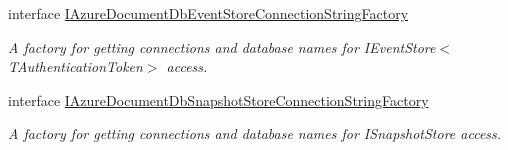 \begin{DoxyCompactItemize}
interface \hyperlink{interfaceCqrs_1_1Azure_1_1DocumentDb_1_1Events_1_1IAzureDocumentDbEventStoreConnectionStringFactory}{I\+Azure\+Document\+Db\+Event\+Store\+Connection\+String\+Factory}
\begin{DoxyCompactList}\small\item\em A factory for getting connections and database names for I\+Event\+Store$<$\+T\+Authentication\+Token$>$ access. \end{DoxyCompactList}\item 
interface \hyperlink{interfaceCqrs_1_1Azure_1_1DocumentDb_1_1Events_1_1IAzureDocumentDbSnapshotStoreConnectionStringFactory}{I\+Azure\+Document\+Db\+Snapshot\+Store\+Connection\+String\+Factory}
\begin{DoxyCompactList}\small\item\em A factory for getting connections and database names for I\+Snapshot\+Store access. \end{DoxyCompactList}\end{DoxyCompactItemize}
